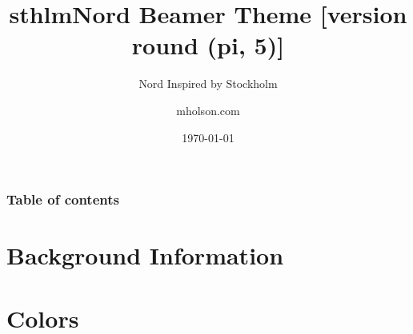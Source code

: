 \documentclass[aspectratio=169, sectionpages, codemintedoverleaf, bibref]{beamer}
\title{sthlmNord Beamer Theme [version round (pi, 5)]}
\subtitle{Nord Inspired by Stockholm}
\author{mholson.com}
\institute{School in Stockholm}
\date{\today}
\begin{document}
\titlepage%


\begin{frame}
	\frametitle{Table of contents}
	\tableofcontents
\end{frame}

\section{Background Information}










\section{Colors}





\end{document}
